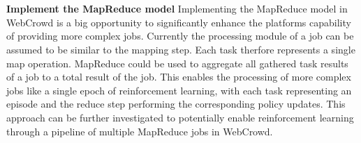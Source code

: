 \\~\\
\textbf{Implement the MapReduce model}
Implementing the MapReduce \cite{conclusion:map-reduce} model in WebCrowd is a big opportunity to significantly enhance the platforms capability of providing more complex jobs. Currently the processing module of a job can be assumed to be similar to the mapping step. Each task therfore represents a single map operation. MapReduce could be used to aggregate all gathered task results of a job to a total result of the job. This enables the processing of more complex jobs like a single epoch of reinforcement learning, with each task representing an episode and the reduce step performing the corresponding policy updates. This approach can be further investigated to potentially enable reinforcement learning through a pipeline of multiple MapReduce jobs in WebCrowd.